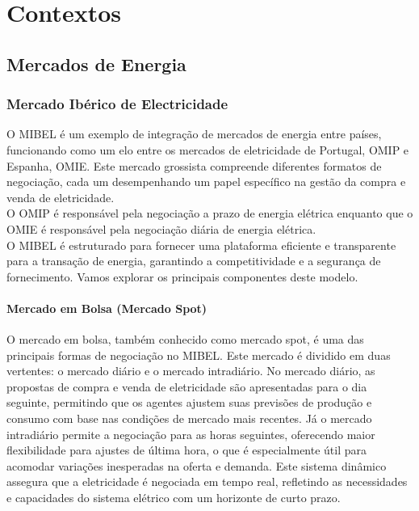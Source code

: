 \chapter{Contextos\label{ch:contextos}}

\section{Mercados de Energia}

\subsection{Mercado Ibérico de Electricidade \label{se:mibel}}

O \gls{MIBEL} é um exemplo de integração de mercados de energia entre países, funcionando como um elo entre os mercados de eletricidade de Portugal, \gls{OMIP} e Espanha, \gls{OMIE}. Este mercado grossista compreende diferentes formatos de negociação, cada um desempenhando um papel específico na gestão da compra e venda de eletricidade. \\
O \gls{OMIP} é responsável pela negociação a prazo de energia elétrica enquanto que o  \gls{OMIE} é responsável pela negociação diária de energia elétrica.\\
O \gls{MIBEL} é estruturado para fornecer uma plataforma eficiente e transparente para a transação de energia, garantindo a competitividade e a segurança de fornecimento. Vamos explorar os principais componentes deste modelo.\\


\subsubsection{Mercado em Bolsa (Mercado Spot) \label{se:mercado_bolsa}}
O mercado em bolsa, também conhecido como mercado spot, é uma das principais formas de negociação no \gls{MIBEL}. Este mercado é dividido em duas vertentes: o mercado diário e o mercado intradiário. No mercado diário, as propostas de compra e venda de eletricidade são apresentadas para o dia seguinte, permitindo que os agentes ajustem suas previsões de produção e consumo com base nas condições de mercado mais recentes. Já o mercado intradiário permite a negociação para as horas seguintes, oferecendo maior flexibilidade para ajustes de última hora, o que é especialmente útil para acomodar variações inesperadas na oferta e demanda. Este sistema dinâmico assegura que a eletricidade é negociada em tempo real, refletindo as necessidades e capacidades do sistema elétrico com um horizonte de curto prazo.\\



